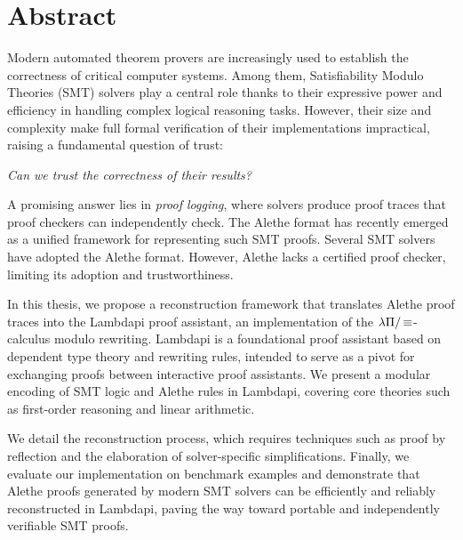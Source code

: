 \begingroup
\let\clearpage\relax
\let\cleardoublepage\relax
\let\cleardoublepage\relax

\chapter*{Abstract}
Modern automated theorem provers are increasingly used to establish the correctness of critical computer systems.
Among them, Satisfiability Modulo Theories (SMT) solvers play a central role thanks to their expressive power and efficiency in handling complex logical reasoning tasks.
However, their size and complexity make full formal verification of their implementations impractical, raising a fundamental question of trust:
\begin{center}
\emph{Can we trust the correctness of their results?}
\end{center}

A promising answer lies in \emph{proof logging}, where solvers produce proof traces that proof checkers can independently check.
The Alethe format has recently emerged as a unified framework for representing such SMT proofs.
Several SMT solvers have adopted the Alethe format.
However, Alethe lacks a certified proof checker, limiting its adoption and trustworthiness.

In this thesis, we propose a reconstruction framework that translates Alethe proof traces into the Lambdapi proof assistant, an implementation of the $\lambda\Pi/\mathop{\equiv}$-calculus modulo rewriting.
Lambdapi is a foundational proof assistant based on dependent type theory and rewriting rules, intended to serve as a pivot for exchanging proofs between interactive proof assistants.
We present a modular encoding of SMT logic and Alethe rules in Lambdapi, covering core theories such as first-order reasoning and linear arithmetic.

We detail the reconstruction process, which requires techniques such as proof by reflection and the elaboration of solver-specific simplifications.
Finally, we evaluate our implementation on benchmark examples and demonstrate that Alethe proofs generated by modern SMT solvers can be efficiently and reliably reconstructed in Lambdapi, paving the way toward portable and independently verifiable SMT proofs.

\endgroup			

\vfill